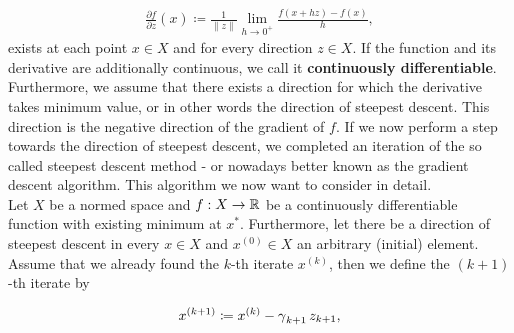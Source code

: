 \begin{align*}
\frac{\partial f}{\partial z} (x) \coloneqq \frac{1}{\|z\|} \lim_{h \to 0^+} \frac{f(x + hz) - f(x)}{h},
\end{align*}
exists at each point $x \in X$ and for every direction $z \in X$. If the function and its derivative are additionally continuous, we call it \textbf{continuously differentiable}.\\
Furthermore, we assume that there exists a direction for which the derivative takes minimum value, or in other words the direction of steepest descent. This direction is the negative direction of the gradient of $f$. If we now perform a step towards the direction of steepest descent, we completed an iteration of the so called steepest descent method - or nowadays better known as the gradient descent algorithm. This algorithm we now want to consider in detail.\\
Let $X$ be a normed space and $f:X\to \operatorname{\mathbb{R}}$ be a continuously differentiable function with existing minimum at $x^{\ast}$.
Furthermore, let there be a direction of steepest descent in every $x \in X$ and $x^{(0)}\in X$ an arbitrary (initial) element. Assume that we already found the $k$-th iterate $x^{(k)}$, then we define the $(k+1)$-th iterate by

\begin{align}\label{eq:gd}
x^{(k+1)} \coloneqq x^{(k)} - \operatorname{\gamma}_{k+1} z_{k+1},
\end{align}


